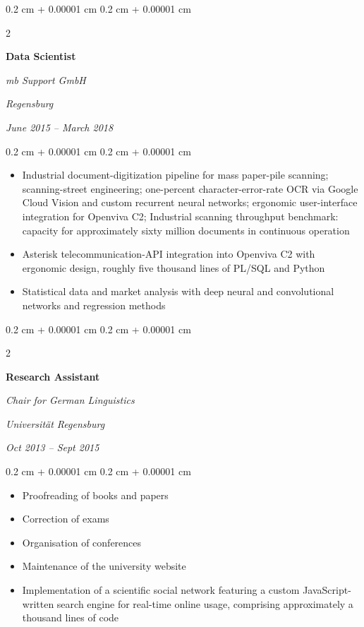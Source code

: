 \documentclass[10pt, letterpaper]{article}
\newenvironment{highlights}{
    \begin{itemize}[
        topsep=0.10 cm,
        parsep=0.10 cm,
        partopsep=0pt,
        itemsep=0pt,
        leftmargin=0.4 cm + 10pt
    ]
}{
    \end{itemize}
}
\newenvironment{onecolentry}{
    \begin{adjustwidth}{
        0.2 cm + 0.00001 cm
    }{
        0.2 cm + 0.00001 cm
    }
}{
    \end{adjustwidth}
}
\newenvironment{twocolentry}[2][]{
    \onecolentry
    \def\secondColumn{#2}
    \setcolumnwidth{\fill, 4.5 cm}
    \begin{paracol}{2}
}{
    \switchcolumn \raggedleft \secondColumn
    \end{paracol}
    \endonecolentry
}
\begin{document}
\vspace{0.2 cm}

\begin{twocolentry}{
    \textit{Regensburg}    
    
    \textit{June 2015 – March 2018}}
    \textbf{Data Scientist}
    
    \textit{mb Support GmbH}
\end{twocolentry}

\vspace{0.10 cm}
\begin{onecolentry}
	\begin{highlights}
		\item Industrial document-digitization pipeline for mass paper-pile scanning; scanning-street engineering; one-percent character-error-rate OCR via Google Cloud Vision and custom recurrent neural networks; ergonomic user-interface integration for Openviva C2; Industrial scanning throughput benchmark: capacity for approximately sixty million documents in continuous operation
        \item Asterisk telecommunication-API integration into Openviva C2 with ergonomic design, roughly five thousand lines of PL/SQL and Python
        \item Statistical data and market analysis with deep neural and convolutional networks and regression methods
	\end{highlights}
\end{onecolentry}
\vspace{0.2 cm}

\begin{twocolentry}{
    \textit{Universität Regensburg}    
    
    \textit{Oct 2013 – Sept 2015}}
    \textbf{Research Assistant}
    
    \textit{Chair for German Linguistics}
\end{twocolentry}

\vspace{0.10 cm}
\begin{onecolentry}
	\begin{highlights}
		\item Proofreading of books and papers
        \item Correction of exams
        \item Organisation of conferences
        \item Maintenance of the university website
        \item Implementation of a scientific social network featuring a custom JavaScript-written search engine for real-time online usage, comprising approximately a thousand lines of code
	\end{highlights}
\end{onecolentry}
\vspace{0.2 cm}
\end{document}
